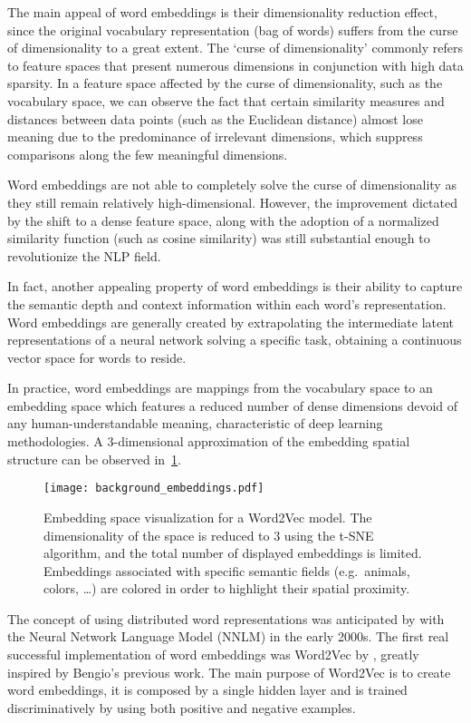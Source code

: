 The main appeal of word embeddings is their dimensionality reduction effect, since the original vocabulary representation (bag of words) suffers from the curse of dimensionality to a great extent.
The `curse of dimensionality' commonly refers to feature spaces that present numerous dimensions in conjunction with high data sparsity.
In a feature space affected by the curse of dimensionality, such as the vocabulary space, we can observe the fact that certain similarity measures and distances between data points (such as the Euclidean distance) almost lose meaning due to the predominance of irrelevant dimensions, which suppress comparisons along the few meaningful dimensions.

Word embeddings are not able to completely solve the curse of dimensionality as they still remain relatively high-dimensional.
However, the improvement dictated by the shift to a dense feature space, along with the adoption of a normalized similarity function (such as cosine similarity) was still substantial enough to revolutionize the NLP field.

In fact, another appealing property of word embeddings is their ability to capture the semantic depth and context information within each word's representation.
Word embeddings are generally created by extrapolating the intermediate latent representations of a neural network solving a specific task, obtaining a continuous vector space for words to reside.

In practice, word embeddings are mappings from the vocabulary space to an embedding space which features a reduced number of dense dimensions devoid of any human-understandable meaning, characteristic of deep learning methodologies.
A $3$-dimensional approximation of the embedding spatial structure can be observed in~\cref{fig:background_embeddings}.

\begin{figure}[t!]
    \centering
    \texttt{[image: background\_embeddings.pdf]}
    \caption[Embedding space visualization for a Word2Vec model.]{Embedding space visualization for a Word2Vec model. The dimensionality of the space is reduced to $3$ using the t-SNE algorithm, and the total number of displayed embeddings is limited. Embeddings associated with specific semantic fields (e.g.\ animals, colors, \dots) are colored in order to highlight their spatial proximity.}
    \label{fig:background_embeddings}
\end{figure}

The concept of using distributed word representations was anticipated by \citet{bengio2000} with the Neural Network Language Model (NNLM) in the early 2000s.
The first real successful implementation of word embeddings was Word2Vec by \citet{mikolov2013}, greatly inspired by Bengio's previous work.
The main purpose of Word2Vec is to create word embeddings, it is composed by a single hidden layer and is trained discriminatively by using both positive and negative examples.

